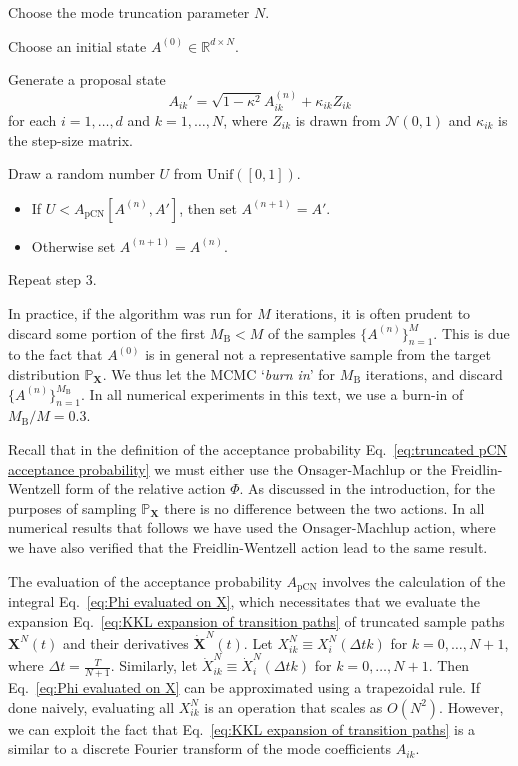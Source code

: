 \begin{enumerate}
\begin{samepage}
	\item Choose the mode truncation parameter $N$.
	\item Choose an initial state $A^{(0)} \in \mathbb{R}^{d \times N}$.
	\item Generate a proposal state
		\begin{equation} \label{eq:pCN proposal numerical algo}
			A_{ik}' = \sqrt{1 - \kappa^2} A_{ik}^{(n)} + \kappa_{ik} Z_{ik}
		\end{equation}
		for each $i=1,\dots,d$ and $k = 1,\dots,N$, where $Z_{ik}$ is drawn from $\mathcal{N}(0,1)$ and $\kappa_{ik}$ is the step-size matrix.
	\item Draw a random number $U$ from $\text{Unif}([0,1])$.
		\begin{itemize}
			\item If $U < A_\text{pCN}[A^{(n)}, A']$, then set $A^{(n+1)} = A'$.
			\item Otherwise set $A^{(n+1)} = A^{(n)}$.
		\end{itemize}
	\item Repeat step 3.
\end{samepage}
\end{enumerate}
In practice, if the algorithm was run for $M$ iterations, it is often prudent to discard some portion of the first $M_\text{B} < M$ of the samples $\{ A^{(n)} \}_{n=1}^{M}$. This is due to the fact that $A^{(0)}$ is in general not a representative sample from the target distribution $\mathbb{P}_\mathbf{X}$. We thus let the MCMC `\textit{burn in}' for $M_\text{B}$ iterations, and discard $\{ A^{(n)} \}_{n=1}^{M_\text{B}}$. In all numerical experiments in this text, we use a burn-in of $M_\text{B}/M = 0.3$.

Recall that in the definition of the acceptance probability Eq.~\ref{eq:truncated pCN acceptance probability} we must either use the Onsager-Machlup or the Freidlin-Wentzell form of the relative action $\Phi$. As discussed in the introduction, for the purposes of sampling $\mathbb{P}_\mathbf{X}$ there is no difference between the two actions. In all numerical results that follows we have used the Onsager-Machlup action, where we have also verified that the Freidlin-Wentzell action lead to the same result.

The evaluation of the acceptance probability $A_\text{pCN}$ involves the calculation of the integral Eq.~\ref{eq:Phi evaluated on X}, which necessitates that we evaluate the expansion Eq.~\ref{eq:KKL expansion of transition paths} of truncated sample paths $\mathbf{X}^N(t)$ and their derivatives $\dot{\mathbf{X}}^N(t)$. Let $X^N_{ik} \equiv X_i^N( \Delta t k )$ for $k = 0,\dots,N+1$, where $\Delta t = \frac{T}{N+1}$. Similarly, let $\dot{X}^N_{ik} \equiv \dot{X}_i^N( \Delta t k )$ for $k = 0,\dots,N+1$. Then Eq.~\ref{eq:Phi evaluated on X} can be approximated using a trapezoidal rule. If done naively, evaluating all $X^N_{ik}$ is an operation that scales as $O(N^2)$. However, we can exploit the fact that Eq.~\ref{eq:KKL expansion of transition paths} is a similar to a discrete Fourier transform of the mode coefficients $A_{ik}$.

